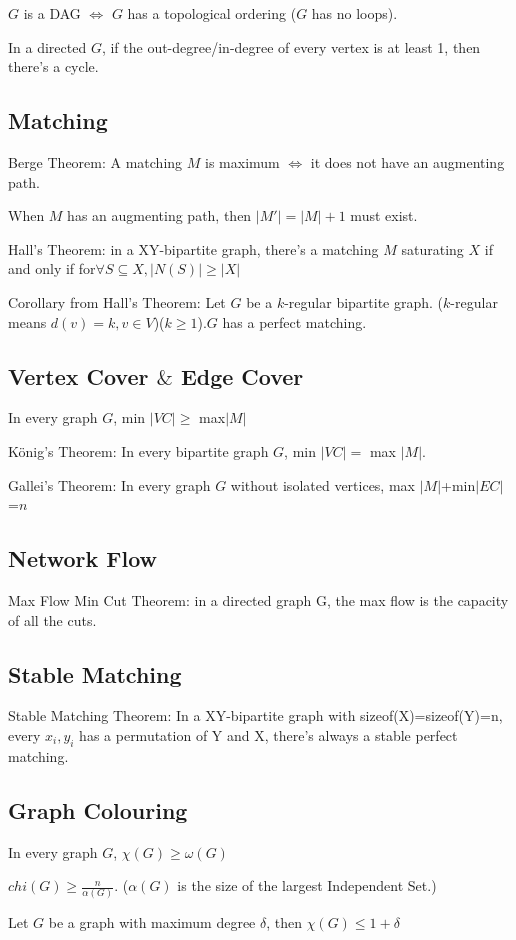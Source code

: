 \documentclass[12pt,a4paper]{ctexrep}
\begin{document}
$G$ is a DAG $\iff$ $G$ has a topological ordering ($G$ has no loops).

In a directed $G$, if the out-degree/in-degree of every vertex is at least 1, then there's a cycle.
\subsection{Matching}
Berge Theorem: A matching $M$ is maximum $\iff$ it does not have an augmenting path.

When $M$ has an augmenting path, then $|M'| = |M|+1$ must exist.

Hall's Theorem: in a XY-bipartite graph, there's a matching $M$ saturating $X$ if and only if for$\forall S \subseteq X, |N(S)|\geq |X|$

Corollary from Hall's Theorem: Let $G$ be a $k$-regular bipartite graph. ($k$-regular means $d(v) = k,v\in V$)($k\geq 1$).$G$ has a perfect matching.
\subsection{Vertex Cover $\&$ Edge Cover}
In every graph $G$, min $|VC| \geq$ max$|M|$

K\"{o}nig's Theorem: In every bipartite graph $G$, min $|VC|=$ max $|M|$.

Gallei's Theorem: In every graph $G$ without isolated vertices, max $|M|$+min$|EC|$=$n$
\subsection{Network Flow}
Max Flow Min Cut Theorem: in a directed graph G, the max flow is the capacity of all the cuts.
\subsection{Stable Matching}
Stable Matching Theorem: In a XY-bipartite graph with sizeof(X)=sizeof(Y)=n, every $x_{i},y_{i}$ has a permutation of Y and X, there's always a stable perfect matching.
\subsection{Graph Colouring}
In every graph $G$, $\chi(G) \geq \omega(G)$

$chi(G)\geq \frac{n}{\alpha(G)}$. ($\alpha(G)$ is the size of the largest Independent Set.)

Let $G$ be a graph with maximum degree $\delta$, then $\chi(G) \leq 1+\delta$
\end{document}
